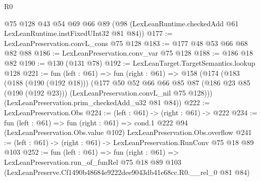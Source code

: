 \begin{lexlean}{R0}
\begin{coremodule}
    @75
    @128
    @43
    @54
    @69
    @66
    @89
    (@98 (LexLeanRuntime.checkedAdd @61 LexLeanRuntime.instFixedUInt32 @81 @84))
@177 := LexLeanPreservation.convL_cons @75 @128
@183 := @177 @48 @53 @66 @68 @82 @88
@186 := LexLeanPreservation.conv_var @75 @128
@188 := @186 @18 @82
@190 := @130 (@131 @78)
@192 := LexLeanTarget.TargetSemantics.lookup @128
@221 := fun (left : @61) =>
  fun (right : @61) =>
  @158
    (@174
      (@183
        (@188 (@190 (@192 @18)))
        (@177
          @50
          @52
          @66
          @66
          @85
          @87
          (@186 @23 @85 (@190 (@192 @23)))
          (LexLeanPreservation.convL_nil @75 @128)))
      (LexLeanPreservation.prim_checkedAdd_u32 @81 @84))
@222 := LexLeanPreservation.Obs
@224 := (left : @61) -> (right : @61) -> @222
@234 := fun (left : @61) =>
  fun (right : @61) =>
  cond.{1} @222 @94 (LexLeanPreservation.Obs.value @102) LexLeanPreservation.Obs.overflow
@241 := (left : @61) -> (right : @61) -> LexLeanPreservation.RunConv @75 @18 @89 @103
@252 := fun (left : @61) =>
  fun (right : @61) =>
  LexLeanPreservation.run_of_funRel
    @75
    @18
    @89
    @103
    (LexLeanPreserve.Cf1490b48684e9222dee9043db41e68cc.R0.__rel_0 @81 @84)
\end{coremodule}
\end{lexlean}
